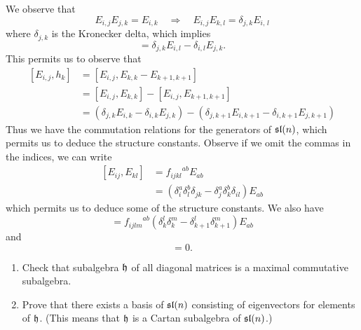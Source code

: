 We observe that
\begin{equation}
E_{i,j}E_{j,k}=E_{i,k}\quad\Rightarrow\quad E_{i,j}E_{k,l}=\delta_{j,k}E_{i,\,l}
\end{equation}
where $\delta_{j,k}$ is the Kronecker delta, which implies
\begin{equation}
[E_{i,j},E_{k,l}]=\delta_{j,k}E_{i,l}-\delta_{i,l}E_{j,k}.
\end{equation}
This permits us to observe that
\begin{subequations}
\begin{align}
[E_{i,j},h_{k}] &= [E_{i,j},E_{k,k}-E_{k+1,k+1}]\\
&=[E_{i,j},E_{k,k}]-[E_{i,j},E_{k+1,k+1}]\\
&=(\delta_{j,k}E_{i,k}-\delta_{i,k}E_{j,k})
-(\delta_{j,k+1}E_{i,k+1}-\delta_{i,k+1}E_{j,k+1})
\end{align}
\end{subequations}
Thus we have the commutation relations for the generators of
$\frak{sl}(n)$, which permits us to deduce the structure
constants. Observe if we omit the commas in the indices, we can write
\begin{subequations}
\begin{align}
[E_{ij},E_{kl}] &= {f_{ijkl}}^{ab}E_{ab}\\
&=(\delta^{a}_{i}\delta^{b}_{l}\delta_{jk}-\delta^{a}_{j}\delta^{b}_{k}\delta_{il})E_{ab}
\end{align}
\end{subequations}
which permits us to deduce some of the structure constants. We
also have
\begin{equation}
[E_{ij},h_{k}]={f_{ijlm}}^{ab}(\delta^{l}_{k}\delta^{m}_{k}-\delta^{l}_{k+1}\delta^{m}_{k+1})E_{ab}
\end{equation}
and
\begin{equation}
[h_{i},h_{j}]=0.
\end{equation}

\begin{exercise}
\begin{enumerate}
\item Check that subalgebra $\frak{h}$ of all diagonal matrices is a maximal
commutative subalgebra.
\item Prove that there exists a basis of $\frak{sl}(n)$
  consisting of eigenvectors for elements of $\frak{h}$. (This means
  that $\frak{h}$ is a Cartan subalgebra of $\frak{sl}(n)$.)
\end{enumerate}
\end{exercise}


